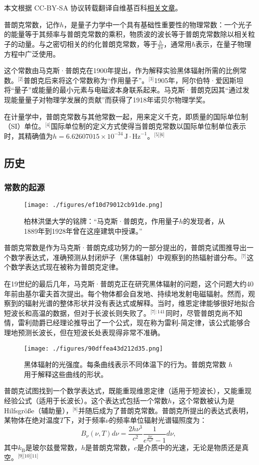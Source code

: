 
本文根据 CC-BY-SA 协议转载翻译自维基百科\href{https://en.wikipedia.org/wiki/Planck_constant}{相关文章}。

普朗克常数，记作\( h \)，是量子力学中一个具有基础性重要性的物理常数：一个光子的能量等于其频率与普朗克常数的乘积，物质波的波长等于普朗克常数除以相关粒子的动量。与之密切相关的约化普朗克常数，等于\( \frac{h}{2\pi} \)，通常用\( \hbar \)表示，在量子物理方程中广泛使用。

这个常数由马克斯·普朗克在1900年提出，作为解释实验黑体辐射所需的比例常数。\(^\text{[2]}\)普朗克后来将这个常数称为“作用量子”。\(^\text{[3]}\)1905年，阿尔伯特·爱因斯坦将“量子”或能量的最小元素与电磁波本身联系起来。马克斯·普朗克因其“通过发现能量量子对物理学发展的贡献”而获得了1918年诺贝尔物理学奖。

在计量学中，普朗克常数与其他常数一起，用来定义千克，即质量的国际单位制（SI）单位。\(^\text{[4]}\)国际单位制的定义方式使得当普朗克常数以国际单位制单位表示时，其精确值为\( h = 6.62607015 \times 10^{-34} \, \text{J} \cdot \text{Hz}^{-1} \)。\(^\text{[5][6]}\)
\subsection{历史}  
\subsubsection{常数的起源}
\begin{figure}[ht]
\centering
\texttt{[image: ./figures/ef10d79012cb91de.png]}
\caption{柏林洪堡大学的铭牌：“马克斯·普朗克，作用量子\(h\)的发现者，从1889年到1928年曾在这座建筑中授课。”} \label{fig_PLKCS_1}
\end{figure}
普朗克常数是作为马克斯·普朗克成功努力的一部分提出的，普朗克试图推导出一个数学表达式，准确预测从封闭炉子（黑体辐射）中观察到的热辐射谱分布。\(^\text{[7]}\)这个数学表达式现在被称为普朗克定律。

在19世纪的最后几年，马克斯·普朗克正在研究黑体辐射的问题，这个问题大约40年前由基尔霍夫首次提出。每个物体都会自发地、持续地发射电磁辐射。然而，观察到的辐射光谱的整体形状并没有表达式或解释。当时，维恩定律能够很好地拟合短波长和高温的数据，但对于长波长则失败了。\(^\text{[7]: 141}\) 同时，尽管普朗克尚不知情，雷利勋爵已经理论推导出了一个公式，现在称为雷利-简定律，该公式能够合理地预测长波长，但在短波长处表现得非常不准确。
\begin{figure}[ht]
\centering
\texttt{[image: ./figures/90dffea43d212d35.png]}
\caption{黑体辐射的光强度。每条曲线表示不同体温下的行为。普朗克常数 \( h \) 用于解释这些曲线的形状。} \label{fig_PLKCS_2}
\end{figure}
普朗克试图找到一个数学表达式，既能重现维恩定律（适用于短波长），又能重现经验公式（适用于长波长）。这个表达式包括一个常数\(h\)，这个常数被认为是 Hilfsgröße（辅助量），\(^\text{[8]}\)并随后成为了普朗克常数。普朗克所提出的表达式表明，某物体在绝对温度\(T\)下，对于频率\(\nu\)的频率单位辐射光谱辐照度为：
\[
B_{\nu}(\nu, T) d\nu = \frac{2h\nu^3}{c^2} \frac{1}{e^{\frac{h\nu}{k_{\mathrm{B}}T}} - 1} d\nu,~
\]
其中\(k_{\text{B}}\)是玻尔兹曼常数，\(h\)是普朗克常数，\(c\)是介质中的光速，无论是物质还是真空。\(^\text{[9][10][11]}\)

